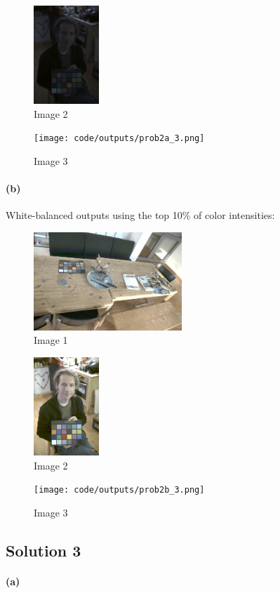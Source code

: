 \documentclass{article}
\newcommand{\solution}[1]{\clearpage \subsection*{Solution #1}}
\newcommand{\spart}[1]{\paragraph{(#1)}}
\begin{document}
\begin{figure}[!h]
  \centering
  \includegraphics[height=10em]{code/outputs/prob2a_2.png}
  \caption{Image 2}
\end{figure}

\begin{figure}[!h]
  \centering
  \texttt{[image: code/outputs/prob2a\_3.png]}
  \caption{Image 3}
\end{figure}

\spart{b} White-balanced outputs using the top 10\% of color intensities:

\begin{figure}[!h]
  \centering
  \includegraphics[height=10em]{code/outputs/prob2b_1.png}
  \caption{Image 1}
\end{figure}

\begin{figure}[!h]
  \centering
  \includegraphics[height=10em]{code/outputs/prob2b_2.png}
  \caption{Image 2}
\end{figure}

\begin{figure}[!h]
  \centering
  \texttt{[image: code/outputs/prob2b\_3.png]}
  \caption{Image 3}
\end{figure}


\solution{3} 

\spart{a}
\end{document}
